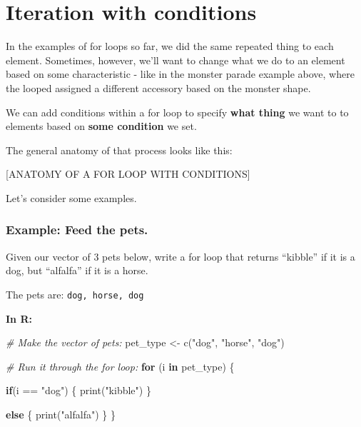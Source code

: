 \documentclass[
]{book}
\newenvironment{Shaded}{\begin{snugshade}}{\end{snugshade}}
\newcommand{\CommentTok}[1]{\textcolor[rgb]{0.56,0.35,0.01}{\textit{#1}}}
\newcommand{\ControlFlowTok}[1]{\textcolor[rgb]{0.13,0.29,0.53}{\textbf{#1}}}
\newcommand{\FunctionTok}[1]{\textcolor[rgb]{0.00,0.00,0.00}{#1}}
\newcommand{\NormalTok}[1]{#1}
\newcommand{\OtherTok}[1]{\textcolor[rgb]{0.56,0.35,0.01}{#1}}
\newcommand{\SpecialCharTok}[1]{\textcolor[rgb]{0.00,0.00,0.00}{#1}}
\newcommand{\StringTok}[1]{\textcolor[rgb]{0.31,0.60,0.02}{#1}}
\begin{document}
\hypertarget{iteration-with-conditions}{%
\section{Iteration with conditions}\label{iteration-with-conditions}}

In the examples of for loops so far, we did the same repeated thing to each element. Sometimes, however, we'll want to change what we do to an element based on some characteristic - like in the monster parade example above, where the looped assigned a different accessory based on the monster shape.

We can add conditions within a for loop to specify \textbf{what thing} we want to to elements based on \textbf{some condition} we set.

The general anatomy of that process looks like this:

{[}ANATOMY OF A FOR LOOP WITH CONDITIONS{]}

Let's consider some examples.

\hypertarget{example-feed-the-pets.}{%
\subsubsection{Example: Feed the pets.}\label{example-feed-the-pets.}}

Given our vector of 3 pets below, write a for loop that returns ``kibble'' if it is a dog, but ``alfalfa'' if it is a horse.

The pets are: \texttt{dog,\ horse,\ dog}

\textbf{In R:}

\begin{Shaded}
\begin{Highlighting}[]
\CommentTok{\# Make the vector of pets:}
\NormalTok{pet\_type }\OtherTok{\textless{}{-}} \FunctionTok{c}\NormalTok{(}\StringTok{"dog"}\NormalTok{, }\StringTok{"horse"}\NormalTok{, }\StringTok{"dog"}\NormalTok{)}

\CommentTok{\# Run it through the for loop: }
\ControlFlowTok{for}\NormalTok{ (i }\ControlFlowTok{in}\NormalTok{ pet\_type) \{}
  
  \ControlFlowTok{if}\NormalTok{(i }\SpecialCharTok{==} \StringTok{"dog"}\NormalTok{) \{}
    \FunctionTok{print}\NormalTok{(}\StringTok{"kibble"}\NormalTok{)}
\NormalTok{  \}}
  
  \ControlFlowTok{else}\NormalTok{ \{}
    \FunctionTok{print}\NormalTok{(}\StringTok{"alfalfa"}\NormalTok{)}
\NormalTok{  \}}
\NormalTok{\}}
\end{Highlighting}
\end{Shaded}
\end{document}
